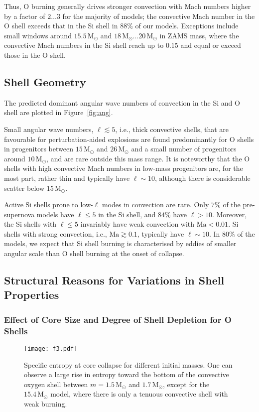 \documentclass[useAMS,usenatbib]{mnras}
\newcommand{\Msun}{\ensuremath{\mathrm{M}_\odot}}
\begin{document}
Thus, O burning generally drives stronger convection with Mach numbers higher by a factor of $2\ldots 3$ for the majority of models; the convective Mach number in the O shell exceeds that in the Si shell in $88\%$ of our models.  Exceptions include small windows around  $15.5 \,\Msun$ and   $18\,\Msun\ldots 20\,\Msun$ in ZAMS mass, where the convective Mach numbers in the Si shell reach up to $0.15$ and equal or exceed those in the O shell.  

\subsection{Shell Geometry}
\label{sec:ShellGeo}
The predicted dominant angular wave numbers of convection in the Si and
O shell are plotted in Figure~\ref{fig:ang}.

Small angular wave numbers, $\ell \lesssim 5$, i.e., thick convective
shells, that are favourable for perturbation-aided explosions are
found predominantly for O shells in progenitors between $15 \,\Msun$
and $26\,\Msun$ and a small number of progenitors around $10\,
  \Msun$, and are rare outside this mass range.  It is noteworthy
that the O shells with high convective Mach numbers in low-mass
progenitors are, for the most part, rather thin and typically have
$\ell \sim 10$, although there is considerable scatter below $15
\,\Msun$.

Active Si shells prone to low-$\ell$ modes in convection are rare.  Only $7\%$ of the pre-supernova models have $\ell\leq5$ in the Si shell, and $84\%$ have $\ell > 10$.  Moreover, the Si shells with $\ell\leq5$ invariably have weak convection with $\mathrm{Ma}<0.01$.  Si shells with strong convection, i.e., $\mathrm{Ma}\gtrsim0.1$, typically have $\ell \sim 10$.  In $80\%$ of the models, we expect that Si shell burning is characterised by eddies of smaller angular scale than O shell burning at the onset of collapse.

\subsection{Structural Reasons for Variations in Shell Properties}

\subsubsection{Effect of Core Size and Degree of Shell Depletion for O Shells} 

\begin{figure}
\texttt{[image: f3.pdf]}
\caption{Specific entropy at core collapse for different initial masses.  One can observe a large rise in entropy toward the bottom of the convective oxygen shell between $m=1.5\,\Msun$ and $1.7\,\Msun$, except for the $15.4\,\Msun$ model, where there is only a tenuous convective shell with weak burning.
\label{fig:S}}
\end{figure}
\end{document}
